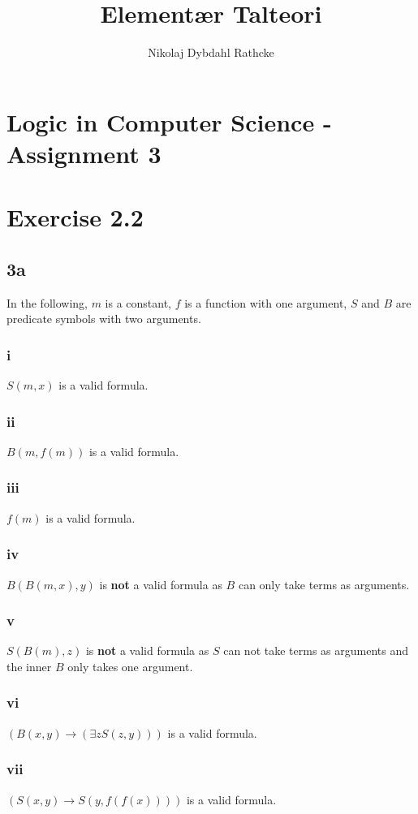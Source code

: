 \documentclass[12pt]{article}
\title{Elementær Talteori}
\author{Nikolaj Dybdahl Rathcke}
\begin{document}
\section*{Logic in Computer Science - Assignment 3}
\section*{Exercise 2.2}
\subsection*{3a}
In the following, $m$ is a constant, $f$ is a function with one argument, $S$ and $B$ are predicate symbols with two arguments.
\subsubsection*{i}
$S(m,x)$ is a valid formula.

\subsubsection*{ii}
$B(m,f(m))$ is a valid formula.

\subsubsection*{iii}
$f(m)$ is a valid formula.

\subsubsection*{iv}
$B(B(m,x),y)$ is \textbf{not} a valid formula as $B$ can only take terms as arguments.

\subsubsection*{v}
$S(B(m),z)$ is \textbf{not} a valid formula as $S$ can not take terms as arguments and the inner $B$ only takes one argument.

\subsubsection*{vi}
$(B(x,y)\to (\exists z S(z,y)))$ is a valid formula.

\subsubsection*{vii}
$(S(x,y)\to S(y,f(f(x))))$ is a valid formula.
\end{document}
